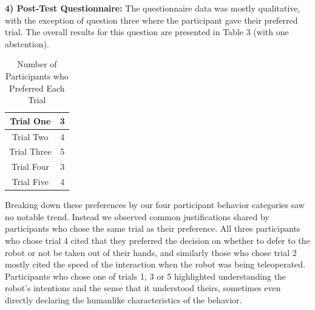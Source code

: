 \documentclass[letterpaper, 10 pt, conference]{ieeeconf}  %
\begin{document}
\textbf{4) Post-Test Questionnaire:} The questionnaire data was mostly qualitative, with the exception of question three where the participant gave their preferred trial. The overall results for this question are presented in Table 3 (with one abstention).

\begin{table}[h]
\caption{Number of Participants who Preferred Each Trial }
\label{Preferences}
\begin{center}
\begin{tabular}{|c||c|}
\hline
Trial One & 3\\
\hline
Trial Two & 4\\
\hline
Trial Three & 5\\
\hline
Trial Four & 3\\
\hline
Trial Five & 4\\
\hline
\end{tabular}
\end{center}
\end{table}

Breaking down these preferences by our four participant behavior categories saw no notable trend. Instead we observed common justifications shared by participants who chose the same trial as their preference. All three participants who chose trial 4 cited that they preferred the decision on whether to defer to the robot or not be taken out of their hands, and similarly those who chose trial 2 mostly cited the speed of the interaction when the robot was being teleoperated. Participants who chose one of trials 1, 3 or 5 highlighted understanding the robot's intentions and the sense that it understood theirs, sometimes even directly declaring the humanlike characteristics of the behavior.


\end{document}
